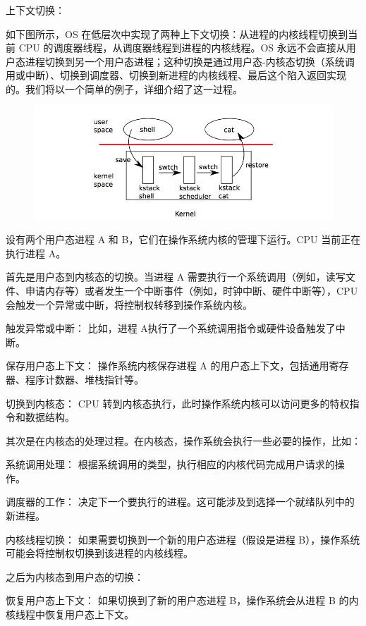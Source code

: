 上下文切换：

如下图所示，OS 在低层次中实现了两种上下文切换：从进程的内核线程切换到当前 CPU 的调度器线程，从调度器线程到进程的内核线程。OS 永远不会直接从用户态进程切换到另一个用户态进程；这种切换是通过用户态-内核态切换（系统调用或中断）、切换到调度器、切换到新进程的内核线程、最后这个陷入返回实现的。我们将以一个简单的例子，详细介绍了这一过程。

\begin{figure}[H]
    \centering
    \includegraphics{figures/05-02-04上下文切换.png}
\end{figure}

设有两个用户态进程 A 和 B，它们在操作系统内核的管理下运行。CPU 当前正在执行进程 A。

首先是用户态到内核态的切换。当进程 A 需要执行一个系统调用（例如，读写文件、申请内存等）或者发生一个中断事件（例如，时钟中断、硬件中断等），CPU 会触发一个异常或中断，将控制权转移到操作系统内核。

触发异常或中断： 比如，进程 A执行了一个系统调用指令或硬件设备触发了中断。

保存用户态上下文： 操作系统内核保存进程 A 的用户态上下文，包括通用寄存器、程序计数器、堆栈指针等。

切换到内核态： CPU 转到内核态执行，此时操作系统内核可以访问更多的特权指令和数据结构。

其次是在内核态的处理过程。在内核态，操作系统会执行一些必要的操作，比如：

\quad  \textbullet 系统调用处理： 根据系统调用的类型，执行相应的内核代码完成用户请求的操作。

\quad  \textbullet 调度器的工作： 决定下一个要执行的进程。这可能涉及到选择一个就绪队列中的新进程。

内核线程切换： 如果需要切换到一个新的用户态进程（假设是进程 B），操作系统可能会将控制权切换到该进程的内核线程。

之后为内核态到用户态的切换：

\quad \textbullet 恢复用户态上下文： 如果切换到了新的用户态进程 B，操作系统会从进程 B 的内核线程中恢复用户态上下文。

